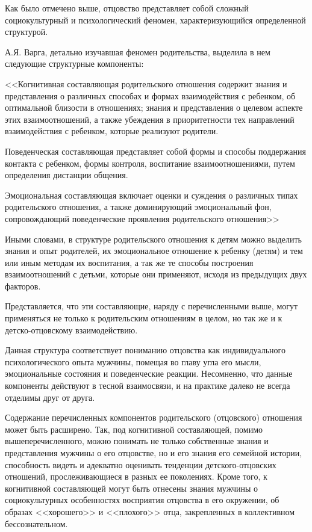 \documentclass{../../common/thesisbyxetex}
\begin{document}
Как было отмечено выше, отцовство представляет собой сложный  социокультурный и психологический
феномен, характеризующийся определенной структурой.

А.Я. Варга, детально изучавшая феномен родительства, выделила в нем следующие структурные
компоненты:

<<Когнитивная составляющая родительского отношения содержит знания и
представления о различных способах и формах взаимодействия с ребенком, об
оптимальной близости в отношениях; знания и представления о целевом аспекте этих
взаимоотношений, а также убеждения в приоритетности тех направлений
взаимодействия с ребенком, которые реализуют родители.

Поведенческая составляющая представляет собой формы и способы поддержания
контакта с ребенком, формы контроля, воспитание взаимоотношениями, путем
определения дистанции общения.

Эмоциональная составляющая включает оценки и суждения о различных типах
родительского отношения, а также доминирующий эмоциональный фон,
сопровождающий поведенческие проявления родительского отношения>> \cite{varga}

Иными словами, в структуре родительского отношения к детям можно выделить знания и опыт родителей,
их эмоциональное отношение к ребенку (детям) и тем или иным методам их воспитания, а так же те
способы построения взаимоотношений с детьми,
которые они применяют, исходя из предыдущих двух факторов.

Представляется, что эти составляющие,
наряду с перечисленными выше, могут применяться не только к родительским отношениям в целом, но
так же и к детско-отцовскому взаимодействию.

Данная структура соответствует пониманию отцовства как индивидуального психологического опыта
мужчины, помещая во главу угла его мысли, эмоциональные состояния и поведенческие реакции.
Несомненно, что данные компоненты действуют в тесной взаимосвязи, и на практике далеко не всегда
отделимы друг от друга.

Содержание перечисленных компонентов родительского (отцовского)
отношения может быть расширено. Так, под когнитивной составляющей, помимо вышеперечисленного, можно
понимать не только собственные знания и представления мужчины о его отцовстве, но и его
знания его семейной истории, способность видеть и адекватно оценивать тенденции детского-отцовских
отношений, прослеживающиеся в разных ее поколениях. Кроме того, к когнитивной составляющей могут
быть отнесены знания мужчины о социокультурных особенностях восприятия отцовства в его окружении,
об образах <<хорошего>> и  <<плохого>> отца, закрепленных в коллективном
бессознательном.
\end{document}
